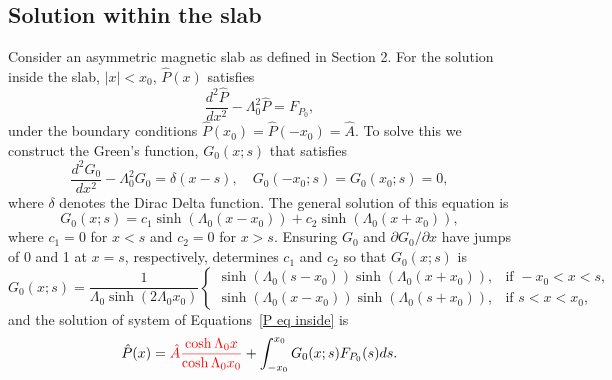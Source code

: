 \documentclass{aastex61}
\begin{document}
\subsection{Solution within the slab}
Consider an asymmetric magnetic slab as defined in Section 2. For the solution inside the slab, $|x| < x_0$, $\hat{P}(x)$ satisfies
\begin{equation}
\frac{d^2\hat{P}}{dx^2} - \Lambda_0^2 \hat{P} = F_{P_0},
\end{equation}
under the boundary conditions $\hat{P}(x_0) = \hat{P}(-x_0) = \hat{A}$. To solve this we construct the Green's function, $G_0(x;s)$ that satisfies
\begin{equation}
\frac{d^2G_0}{dx^2} - \Lambda_0^2 G_0 = \delta(x-s), \quad G_0(-x_0;s) = G_0(x_0;s) = 0,
\label{P eq inside}
\end{equation}
where $\delta$ denotes the Dirac Delta function. The general solution of this equation is
\begin{equation}
G_0(x;s) = c_1\sinh(\Lambda_0(x - x_0)) + c_2\sinh(\Lambda_0(x + x_0)),
\end{equation}
where $c_1 = 0$ for $x < s$ and $c_2 = 0$ for $x > s$. Ensuring $G_0$ and $\partial G_0 / \partial x$ have jumps of 0 and 1 at $x = s$, respectively, determines $c_1$ and $c_2$ so that $G_0(x;s)$ is
\begin{equation}
G_0(x;s) = \frac{1}{\Lambda_0\sinh(2\Lambda_0 x_0)}
\begin{cases}
\sinh(\Lambda_0(s - x_0))\sinh(\Lambda_0(x + x_0)), & \text{if } -x_0<x<s, \\
\sinh(\Lambda_0(x - x_0))\sinh(\Lambda_0(s + x_0)), & \text{if } s<x<x_0,
\end{cases}
\end{equation}
and the solution of system of Equations~\eqref{P eq inside} is
\begin{equation}
\hat{P}(x) = \textcolor{red}{\hat{A}\frac{\cosh{\Lambda_0x}}{\cosh{\Lambda_0x_0}}} + \int_{-x_0}^{x_0} G_0(x;s) F_{P_0}(s) ds.
\label{P sol 0}
\end{equation}
\end{document}
